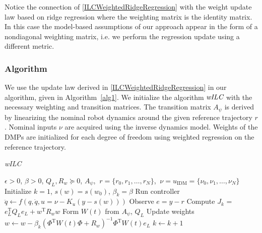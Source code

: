\documentclass[10pt,a4paper]{article}
\newcommand{\joint}{q} %
\newcommand{\state}{y} %
\newcommand{\dmp}{s} %
\newcommand{\error}{e} %
\newcommand{\traj}{r} %
\newcommand{\sysInput}{u} %
\newcommand{\fullvec}{\psi} %
\newcommand{\weights}{w} %
\newcommand{\dynamics}{f}
\newcommand{\ValueFunction}{J}
\newcommand{\threshold}{\epsilon}
\newcommand{\alg}{\emph{wILC}}
\begin{document}
Notice the connection of \eqref{ILCWeightedRidgeRegression} with the weight update law based on ridge regression where the weighting matrix is the identity matrix. In this case the model-based assumptions of our approach appear in the form of a nondiagonal weighting matrix, i.e. we perform the regression update using a different metric.

\subsubsection{Algorithm}

We use the update law derived in \eqref{ILCWeightedRidgeRegression} in our algorithm, given in Algorithm~\ref{alg1}. We initialize the algorithm $\alg$ with the necessary weighting and transition matrices. The transition matrix $A_{\fullvec}$ is derived by linearizing the nominal robot dynamics around the given reference trajectory $r$. Nominal inputs $\nu$ are acquired using the inverse dynamics model. Weights of the DMPs are initialized for each degree of freedom using weighted regression on the reference trajectory.


\begin{algorithm}[tb]
   \caption{\alg}
   \label{alg1}
\begin{algorithmic}
    $\threshold > 0$, $\beta > 0$, $Q_L, R_{\weights} \succeq 0$, $A_{\fullvec}$, $\ \traj = \{\traj_0, \traj_1, \ldots, \traj_N \}$, $\ \nu = \sysInput_{\mathrm{IDM}} = \{\nu_0, \nu_1, \ldots, \nu_N \}$
   \STATE Initialize $k = 1$, $\dmp(\weights) = \dmp(\weights_0)$, $\beta_k = \beta$
   \REPEAT 
 	   \STATE Run controller $\ddot{\joint} \leftarrow \dynamics(\joint,\dot{\joint},\sysInput = \nu - K_{\sysInput}(\state - \dmp(\weights)))$
 	   \STATE Observe $\error = \state - \traj$
 	   \STATE Compute $\ValueFunction_k$ = $\error_L^{\mathrm{T}}Q_L\error_L + \weights^{\mathrm{T}}R_w\weights$
 	   \STATE Form $W(t)$ from $A_{\fullvec}$, $Q_L$
 	   \STATE Update weights $\weights \leftarrow \weights - \beta_k(\Phi^{\mathrm{T}}W(t)\Phi + R_{\weights})^{-1}\Phi^{\mathrm{T}}W(t)\error_L$
 	   \STATE $k \leftarrow k + 1$
   \UNTIL{$\ValueFunction_k < \threshold$}
\end{algorithmic}
\end{algorithm}
\end{document}
